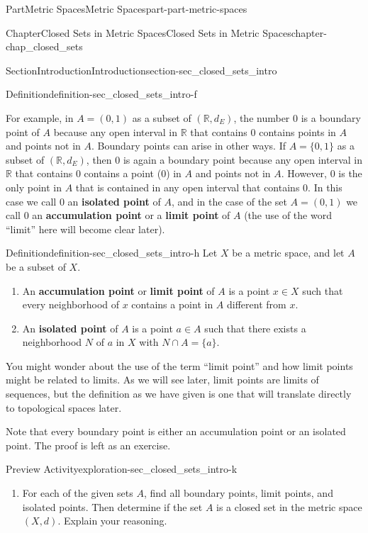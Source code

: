 \documentclass[oneside,10pt,]{book}
\newcommand{\terminology}[1]{\textbf{#1}}
\numberwithin{equation}{chapter}
\newcommand{\R}{\mathbb{R}}
\begin{document}
\begin{partptx}{Part}{Metric Spaces}{}{Metric Spaces}{}{}{part-part-metric-spaces}
\begin{chapterptx}{Chapter}{Closed Sets in Metric Spaces}{}{Closed Sets in Metric Spaces}{}{}{chapter-chap_closed_sets}
\begin{sectionptx}{Section}{Introduction}{}{Introduction}{}{}{section-sec_closed_sets_intro}
\begin{definition}{Definition}{}{definition-sec_closed_sets_intro-f}
\end{definition}
For example, in \(A=(0,1)\) as a subset of \((\R, d_E)\), the number 0 is a boundary point of \(A\) because any open interval in \(\R\) that contains \(0\) contains points in \(A\) and points not in \(A\). Boundary points can arise in other ways. If \(A = \{0,1\}\) as a subset of \((\R, d_E)\), then 0 is again a boundary point because any open interval in \(\R\) that contains \(0\) contains a point (\(0\)) in \(A\) and points not in \(A\). However, \(0\) is the only point in \(A\) that is contained in any open interval that contains \(0\). In this case we call \(0\) an \terminology{isolated point} of \(A\), and in the case of the set \(A = (0,1)\) we call \(0\) an \terminology{accumulation point} or a \terminology{limit point} of \(A\) (the use of the word ``limit'' here will become clear later).%
\begin{definition}{Definition}{}{definition-sec_closed_sets_intro-h}%
%
%
%
Let \(X\) be a metric space, and let \(A\) be a subset of \(X\).%
\begin{enumerate}
\item{}An \terminology{accumulation point} or \terminology{limit point} of \(A\) is a point \(x \in X\) such that every neighborhood of \(x\) contains a point in \(A\) different from \(x\).%
\item{}An \terminology{isolated point} of \(A\) is a point \(a \in A\) such that there exists a neighborhood \(N\) of \(a\) in \(X\) with \(N \cap A = \{a\}\).%
\end{enumerate}
%
\end{definition}
You might wonder about the use of the term ``limit point'' and how limit points might be related to limits. As we will see later, limit points are limits of sequences, but the definition as we have given is one that will translate directly to topological spaces later.%
\par
Note that every boundary point is either an accumulation point or an isolated point. The proof is left as an exercise.%
\begin{exploration}{Preview Activity}{}{exploration-sec_closed_sets_intro-k}%
\begin{enumerate}[font=\bfseries,label=(\alph*),ref=\alph*]%
\item{}For each of the given sets \(A\), find all boundary points, limit points, and isolated points. Then determine if the set \(A\) is a closed set in the metric space \((X,d)\). Explain your reasoning.%

\end{enumerate}
\end{exploration}
\end{sectionptx}
\end{chapterptx}
\end{partptx}
\end{document}
